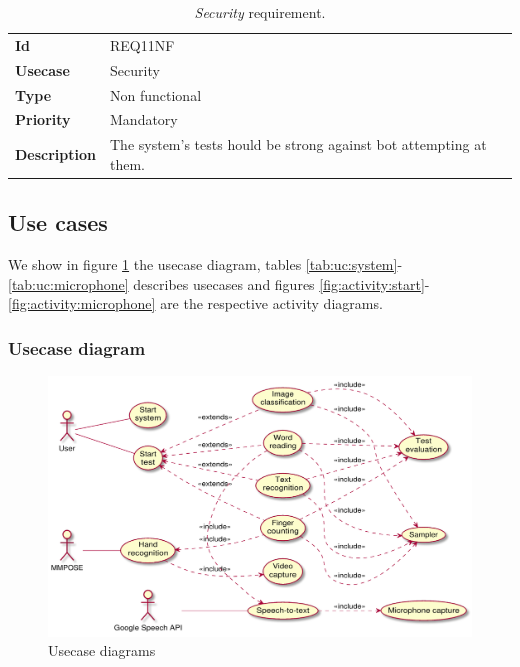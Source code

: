 \begin{table}[h!t]
    \centering
    \caption{\emph{Security} requirement.}
    \label{tab:req:security}
    \centering
    \begin{tabular}{l | p{80mm}}
        \textbf{Id}          & REQ11NF                                                            \\
        \textbf{Usecase}     & Security                                                           \\
        \textbf{Type}        & Non functional                                                     \\
        \textbf{Priority}    & Mandatory                                                          \\
        \textbf{Description} & The system's tests hould be strong against bot attempting at them.
    \end{tabular}
\end{table}

\clearpage
\subsection{Use cases}
We show in figure \ref{fig:usecase:diagram} the usecase diagram, tables \ref{tab:uc:system}-\ref{tab:uc:microphone} describes usecases and figures \ref{fig:activity:start}-\ref{fig:activity:microphone} are the respective activity diagrams.

\subsubsection{Usecase diagram}
\begin{figure}[h!t]
    \centering
    \includegraphics[scale=0.55]{assets/plantuml/pdf/diagram.pdf}
    \caption{Usecase diagrams}
    \label{fig:usecase:diagram}
\end{figure}

